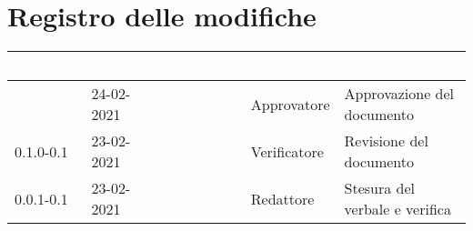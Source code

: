 \section*{Registro delle modifiche}
{
\setcounter{table}{-1}
{
\renewcommand{\arraystretch}{1.5}
\centering
\begin{longtable}{C{1.7cm} C{2.5cm} C{3.2cm} C{2.7cm} C{4.8cm}}
\textcolor{white}{\textbf{Versione}}&
\textcolor{white}{\textbf{Data}}&
\textcolor{white}{\textbf{Nominativo}}&
\textcolor{white}{\textbf{Ruolo}}&
\textcolor{white}{\textbf{Descrizione}}\\	
\endhead

\Versionedoc{} & 24-02-2021 & \Approvatore{} & Approvatore & Approvazione del documento\\	
0.1.0-0.1 & 23-02-2021 & \Verificatori{} & Verificatore & Revisione del documento\\		
0.0.1-0.1 & 23-02-2021 & \Redattori{} & Redattore & Stesura del verbale e verifica\\
		
\end{longtable}
}
}
